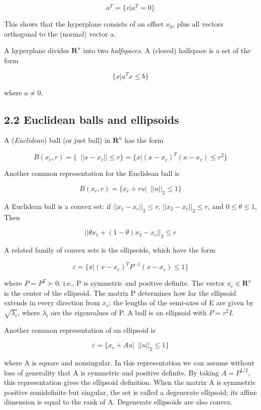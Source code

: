 \documentclass{article}
\begin{document}
\[
a^T=\{v|a^T=0\}
\]

This shows that the hyperplane consists of an offset $x_0$, plus all vectors orthogonal
to the (normal) vector a.

A hyperplane divides $\mathbf{R}^n$ into two \textit{halfspaces}. A (closed) halfspace is a set of
the form

\[
\{x|a^T x\le b\}    
\]

where $a \ne 0$.

\subsection*{2.2 Euclidean balls and ellipsoids}

A (\textit{Euclidean}) ball (or just ball) in $\mathbf{R}^n$ has the form

\[
B(x_c,r)=\{\enspace ||x-x_c||\le r\}=\{x|(x-x_c)^T(x-x_c)\le r^2\}    
\]

Another common representation for the Euclidean ball is

\[
B(x_c,r)=\{x_c+ru|\enspace ||u||_2\le 1\}    
\]

A Euclidean ball is a convex set: if $||x_1-x_c||_2 \le r$, $||x_2-x_c||_2 \le r$, and
$0 \le \theta \le1$, Then

\[
||\theta x_1+(1-\theta)x_2-x_c||_2\le r    
\]

A related family of convex sets is the ellipsoids, which have the form

\[
\varepsilon =\{x|(x-x_c)^TP^{-1}(x-x_c)\le1\}
\]

where $P=P^T\succ 0$, i.e., P is symmetric and positive definite. The vector $x_c \in \mathbf{R}^n$
is the center of the ellipsoid. The matrix P determines how far the ellipsoid extends
in every direction from $x_c$; the lengths of the semi-axes of E are given by $\sqrt{\lambda_i}$, where
$\lambda_i$ are the eigenvalues of P. A ball is an ellipsoid with $P=r^2I$.

Another common representation of an ellipsoid is

\[
\varepsilon =\{x_c+Au|\enspace ||u||_2\le1\}
\]

where A is square and nonsingular. In this representation we can assume without
loss of generality that A is symmetric and positive definite. By taking $A=P^{1/2}$, this representation gives the ellipsoid definition. 
When the matrix A is symmetric positive semidefinite but singular, the set is called a degenerate
ellipsoid; its affine dimension is equal to the rank of A. Degenerate ellipsoids are
also convex.
\end{document}
